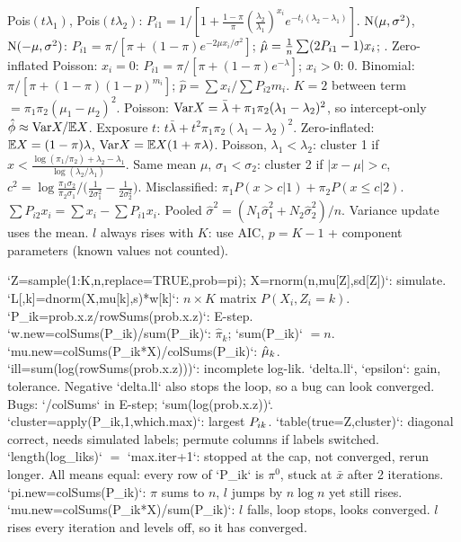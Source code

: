 \li Pois$(t\lambda_1)$, Pois$(t\lambda_2)$: $P_{i1}=1/[1+\frac{1-\pi}\pi(\frac{\lambda_2}{\lambda_1})^{x_i}e^{-t_i(\lambda_2-\lambda_1)}]$.
\li $\mathrm{N}(\mu,\sigma^2)$, $\mathrm{N}(-\mu,\sigma^2)$: $P_{i1}=\pi/[\pi+(1-\pi)e^{-2\mu x_i/\sigma^2}]$; $\hat{\mu}=\frac1n\sum(2P_{i1}-1)x_i$; .
\li Zero-inflated Poisson: $x_i=0$: $P_{i1}=\pi/[\pi+(1-\pi)e^{-\lambda}]$; $x_i>0$: 0. Binomial: $\pi/[\pi+(1-\pi)(1-p)^{m_i}]$; $\hat p=\sum x_i/\sum P_{i2}m_i$.
\sk{} $K=2$ between term $=\pi_1\pi_2(\mu_1-\mu_2)^2$. Poisson: $\mathrm{Var} X=\bar\lambda+\pi_1\pi_2(\lambda_1-\lambda_2)^2$, so intercept-only $\hat{\phi}\approx\mathrm{Var} X/\mathbb{E} X$. Exposure $t$: $t\bar\lambda+t^2\pi_1\pi_2(\lambda_1-\lambda_2)^2$. Zero-inflated: $\mathbb{E} X=(1-\pi)\lambda$, $\mathrm{Var} X=\mathbb{E} X(1+\pi\lambda)$.
\sk{} Poisson, $\lambda_1<\lambda_2$: cluster 1 if $x<\frac{\log(\pi_1/\pi_2)+\lambda_2-\lambda_1}{\log(\lambda_2/\lambda_1)}$. Same mean $\mu$, $\sigma_1<\sigma_2$: cluster 2 if $|x-\mu|>c$, $c^2=\log\frac{\pi_1\sigma_2}{\pi_2\sigma_1}\big/\big(\frac1{2\sigma_1^2}-\frac1{2\sigma_2^2}\big)$. Misclassified: $\pi_1P(x>c|1)+\pi_2P(x\le c|2)$.
\sk{} $\sum P_{i2}x_i=\sum x_i-\sum P_{i1}x_i$. Pooled $\hat\sigma^2=(N_1\hat\sigma_1^2+N_2\hat\sigma_2^2)/n$. Variance update uses the  mean.
\sk{} $l$ always rises with $K$: use AIC, $p=K-1$ + component parameters (known values not counted).
\bx
{}\par
`Z=sample(1:K,n,replace=TRUE,prob=pi); X=rnorm(n,mu[Z],sd[Z])`: simulate.
\li`L[,k]=dnorm(X,mu[k],s)*w[k]`: $n\times K$ matrix $P(X_i,Z_i{=}k)$.
\li`P_ik=prob.x.z/rowSums(prob.x.z)`: E-step.
\li`w.new=colSums(P_ik)/sum(P_ik)`: $\hat\pi_k$; `sum(P_ik)` $=n$.
\li`mu.new=colSums(P_ik*X)/colSums(P_ik)`: $\hat{\mu}_k$.
\li`ill=sum(log(rowSums(prob.x.z)))`: incomplete log-lik.
\li`delta.ll`, `epsilon`: gain, tolerance. Negative `delta.ll` also stops the loop, so a bug can look converged. Bugs: `/colSums` in E-step; `sum(log(prob.x.z))`.
\li`cluster=apply(P_ik,1,which.max)`: largest $P_{ik}$. `table(true=Z,cluster)`: diagonal correct, needs simulated labels; permute columns if labels switched.
\li`length(log_liks)` $=$ `max.iter+1`: stopped at the cap, not converged, rerun longer. All means equal: every row of `P_ik` is $\pi^0$, stuck at $\bar x$ after 2 iterations.
\li{} `pi.new=colSums(P_ik)`: $\pi$ sums to $n$, $l$ jumps by $n\log n$ yet still rises. `mu.new=colSums(P_ik*X)/sum(P_ik)`: $l$ falls, loop stops, looks converged.
\li{} $l$ rises every iteration and levels off, so it has converged.
